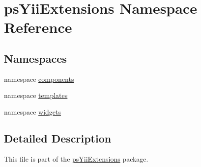 \hypertarget{namespacepsYiiExtensions}{
\section{psYiiExtensions Namespace Reference}
\label{namespacepsYiiExtensions}
}
\subsection*{Namespaces}
\begin{DoxyCompactItemize}
\item 
namespace \hyperlink{namespacepsYiiExtensions_1_1components}{components}
\item 
namespace \hyperlink{namespacepsYiiExtensions_1_1templates}{templates}
\item 
namespace \hyperlink{namespacepsYiiExtensions_1_1widgets}{widgets}
\end{DoxyCompactItemize}


\subsection{Detailed Description}
This file is part of the \hyperlink{namespacepsYiiExtensions}{psYiiExtensions} package.

